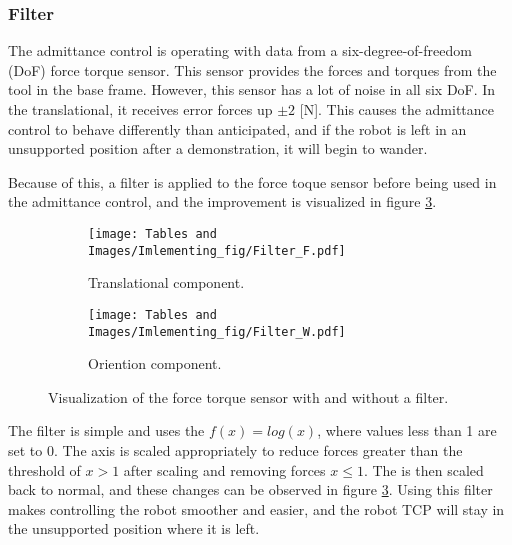 \subsubsection{Filter}

The admittance control is operating with data from a six-degree-of-freedom (DoF) force torque sensor. 
This sensor provides the forces and torques from the tool in the base frame. However, this sensor has a lot of noise in all six DoF. 
In the translational, it receives error forces up $\pm 2$ [N]. 
This causes the admittance control to behave differently than anticipated, and if the robot is left in an unsupported position after a demonstration, it will begin to wander.

Because of this, a filter is applied to the force toque sensor before being used in the admittance control, and the improvement is visualized in figure \ref{fig:Adm:filter}.

\begin{figure}[!htb]
  \centering
  \begin{subfigure}[b]{0.45\linewidth}
    \texttt{[image: Tables and Images/Imlementing\_fig/Filter\_F.pdf]}
    \caption{Translational component.}
    \label{fig:Adm:filter_translation}
  \end{subfigure}
  \hfill
  \begin{subfigure}[b]{0.45\linewidth}
    \texttt{[image: Tables and Images/Imlementing\_fig/Filter\_W.pdf]}
    \caption{Oriention component.}
    \label{fig:Adm:filter_rotation}
  \end{subfigure}
  \caption{Visualization of the force torque sensor with and without a filter.}
  \label{fig:Adm:filter}
\end{figure}

The filter is simple and uses the $f(x) = log(x)$, where values less than 1 are set to 0. The axis is scaled appropriately to reduce forces greater than the threshold of $x > 1$ after scaling and removing forces $x \leq 1$. The is then scaled back to normal, and these changes can be observed in figure \ref{fig:Adm:filter}. 
Using this filter makes controlling the robot smoother and easier, and the robot TCP will stay in the unsupported position where it is left.
